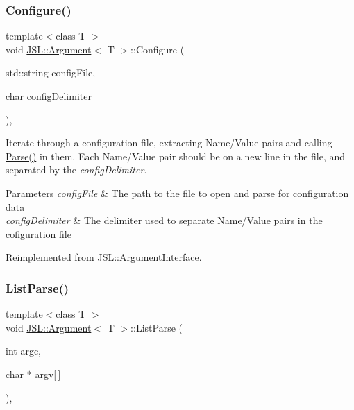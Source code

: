 \mbox{\label{classJSL_1_1Argument_aa626ff37dbebaf0501614dc625a76383}} 
\subsubsection{\texorpdfstring{Configure()}{Configure()}}
{\footnotesize\ttfamily template$<$class T $>$ \\
void \hyperlink{classJSL_1_1Argument}{J\+S\+L\+::\+Argument}$<$ T $>$\+::Configure (\begin{DoxyParamCaption}\item[{std\+::string}]{config\+File,  }\item[{char}]{config\+Delimiter }\end{DoxyParamCaption})\hspace{0.3cm}{\ttfamily [inline]}, {\ttfamily [virtual]}}



Iterate through a configuration file, extracting Name/\+Value pairs and calling \hyperlink{classJSL_1_1Argument_a8984e7ce23155259d90a3e98170f36e0}{Parse()} in them. Each Name/\+Value pair should be on a new line in the file, and separated by the {\itshape config\+Delimiter}. 


\begin{DoxyParams}{Parameters}
{\em config\+File} & The path to the file to open and parse for configuration data \\
\hline
{\em config\+Delimiter} & The delimiter used to separate Name/\+Value pairs in the cofiguration file \\
\hline
\end{DoxyParams}


Reimplemented from \hyperlink{classJSL_1_1ArgumentInterface_aac7c3106f99c407e625b9bc6a6c8c446}{J\+S\+L\+::\+Argument\+Interface}.

\mbox{\label{classJSL_1_1Argument_aa2b18bb35e90f91e224a06d60835053a}} 
\subsubsection{\texorpdfstring{List\+Parse()}{ListParse()}}
{\footnotesize\ttfamily template$<$class T $>$ \\
void \hyperlink{classJSL_1_1Argument}{J\+S\+L\+::\+Argument}$<$ T $>$\+::List\+Parse (\begin{DoxyParamCaption}\item[{int}]{argc,  }\item[{char $\ast$}]{argv\mbox{[}$\,$\mbox{]} }\end{DoxyParamCaption})\hspace{0.3cm}{\ttfamily [inline]}, {\ttfamily [virtual]}}



